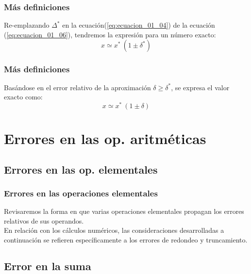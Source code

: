 \documentclass[12pt]{beamer}
\begin{document}
\begin{frame}
\frametitle{Más definiciones}
Re-emplazando $\Delta^{*}$ en la ecuación(\ref{eq:ecuacion_01_04}) de la ecuación (\ref{eq:ecuacion_01_06}), tendremos la expresión para un número exacto:
\pause
\begin{equation}
x \simeq x^{*} \: (1 \pm \delta^{*})
\label{eq:ecuacion_01_07}
\end{equation}
\end{frame}
\begin{frame}
\frametitle{Más definiciones}
Basándose en el error relativo de la aproximación $\delta \geq \delta^{*}$, se expresa el valor exacto como:
\begin{equation}
x \simeq x^{*} \: (1 \pm \delta)
\label{eq:ecuacion_01_08}
\end{equation}
\end{frame}

\section{Errores en las op. aritméticas}
\subsection{Errores en las op. elementales}

\begin{frame}
\frametitle{Errores en las operaciones elementales}
Revisaremos la forma en que varias operaciones elementales propagan los errores relativos de sus operandos.
\\
\bigskip
\pause
En relación con los cálculos numéricos, las consideraciones desarrolladas a continuación se refieren específicamente a los errores de redondeo y truncamiento.
\end{frame}

\subsection{Error en la suma}
\end{document}
